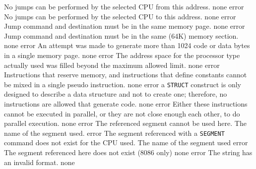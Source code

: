 \documentclass[12pt,twoside]{report}
\newcommand{\tty}[1]{{\tt #1}}
\begin{document}
\begin{description}
               {No jumps can be performed by the selected CPU from this
                address.}
               {none}
               {error}
               {No jumps can be performed by the selected CPU to this
                address.}
               {none}
               {error}
               {Jump command and destination must be in the same memory
                page.}
               {none}
               {error}
               {Jump command and destination must be in the same (64K)
                memory section.}
               {none}
               {error}
               {An attempt was made to generate more than 1024 code or
                data bytes in a single memory page.}
               {none}
               {error}
               {The address space for the processor type actually used was
                filled beyond the maximum allowed limit.}
               {none}
               {error}
               {Instructions that reserve memory, and instructions that define
                constants cannot be mixed in a single pseudo instruction.}
               {none}
               {error}
               {a \tty{STRUCT} construct is only designed to describe a
                data structure and not to create one; therefore, no
                instructions are allowed that generate code.}
               {none}
               {error}
               {Either these instructions cannot be executed in parallel,
                or they are not close enough each other, to do parallel
                execution.}
               {none}
               {error}
               {The referenced segment cannot be used here.}
               {The name of the segment used.}
               {error}
               {The segment referenced with a \tty{SEGMENT} command does not
                exist for the CPU used.}
               {The name of the segment used}
               {error}
               {The segment referenced here does not exist (8086 only)}
               {none}
               {error}
               {The string has an invalid format.}
               {none}

\end{description}
\end{document}
